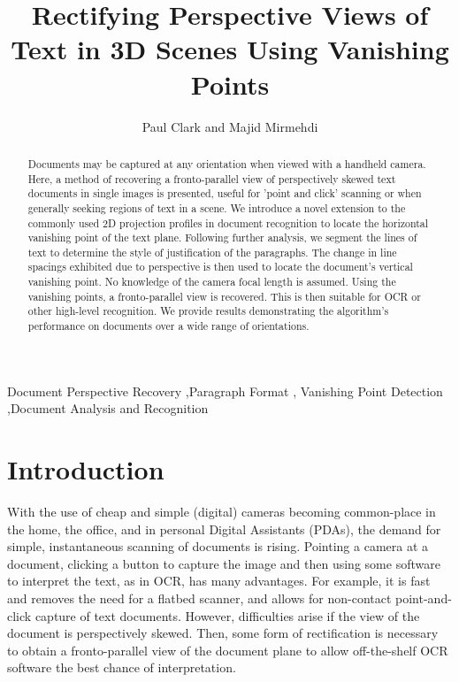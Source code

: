 \documentclass{elsart}   %
\begin{document}
\begin{frontmatter}

\title{Rectifying Perspective Views of Text in 3D Scenes Using Vanishing Points}

\author{Paul Clark and Majid Mirmehdi}  %

\address{
Department of Computer Science, University of Bristol, Bristol BS8 1UB, UK %
}

\begin{abstract}
Documents may be captured at any orientation when viewed with a handheld camera.
Here, a method of recovering a fronto-parallel view of perspectively skewed text
documents in single images is presented, useful for 'point and click' scanning
or when generally seeking regions of text in a scene.  We introduce a novel
extension to the commonly used 2D projection profiles in document recognition to
locate the horizontal vanishing point of the text plane.  Following further
analysis, we segment the lines of text to determine the style of justification
of the paragraphs.  The change in line spacings exhibited due to perspective is
then used to locate the document's vertical vanishing point. No knowledge of the
camera focal length is assumed. Using the vanishing points, a fronto-parallel
view is recovered. This is then suitable for OCR or other high-level
recognition.  We provide results demonstrating the algorithm's performance on
documents over a wide range of orientations.
\end{abstract}

\begin{keyword}
Document Perspective Recovery  \sep Paragraph Format \sep 
Vanishing Point Detection \sep Document Analysis and Recognition 
\end{keyword}
\end{frontmatter}

\baselineskip 24pt

\section{Introduction}
With the use of cheap and simple (digital) cameras becoming common-place in the
home, the office, and in personal Digital Assistants (PDAs), the demand for
simple, instantaneous scanning of documents is rising. Pointing a camera at a
document, clicking a button to capture the image and then using some software to
interpret the text, as in OCR, has many advantages. For example, it is fast and
removes the need for a flatbed scanner, and allows for non-contact
point-and-click capture of text documents. However, difficulties arise if the
view of the document is perspectively skewed. Then, some form of rectification
is necessary to obtain a fronto-parallel view of the document plane to allow
off-the-shelf OCR software the best chance of interpretation.
\end{document}
